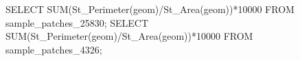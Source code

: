 \lstset{caption=Crear una función para calcular el IDW (I),label= IDW1}
\begin{SQL}
SELECT SUM(St_Perimeter(geom)/St_Area(geom))*10000 FROM sample_patches_25830;
SELECT SUM(St_Perimeter(geom)/St_Area(geom))*10000 FROM sample_patches_4326;
\end{SQL}
